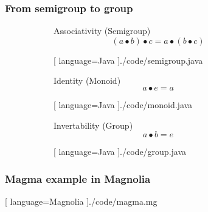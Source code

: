 \begin{frame}
  \frametitle{From semigroup to group}
  \begin{figure}[H]
    \begin{subfigure}[h]{0.45\textwidth}
      Associativity (Semigroup)
      \begin{equation}
        (a \bullet b) \bullet c = a \bullet (b \bullet c)
      \end{equation}
    \end{subfigure}
    \hfill
    \begin{subfigure}[h]{0.45\textwidth}
  \begin{center}
    
    [ language=Java
    ]{./code/semigroup.java}
  \end{center}
\end{subfigure}
  \end{figure}
  \begin{figure}[H]
    \begin{subfigure}[h]{0.45\textwidth}
      Identity (Monoid)
      \begin{equation}
        a \bullet e = a
      \end{equation}
    \end{subfigure}
    \hfill
    \begin{subfigure}[h]{0.45\textwidth}
  \begin{center}
    
    [ language=Java
    ]{./code/monoid.java}
  \end{center}
\end{subfigure}
  \end{figure}
  \begin{figure}[H]
    \begin{subfigure}[h]{0.45\textwidth}
      Invertability (Group)
      \begin{equation}
        a \bullet b = e
      \end{equation}
    \end{subfigure}
    \hfill
    \begin{subfigure}[h]{0.45\textwidth}
  \begin{center}
    
    [ language=Java
    ]{./code/group.java}
  \end{center}
\end{subfigure}
  \end{figure}
\end{frame}

\showlogo

\begin{frame}
  \frametitle{Magma example in Magnolia}
  \begin{center}
    
    [ language=Magnolia
    ]{./code/magma.mg}
  \end{center}
\end{frame}

